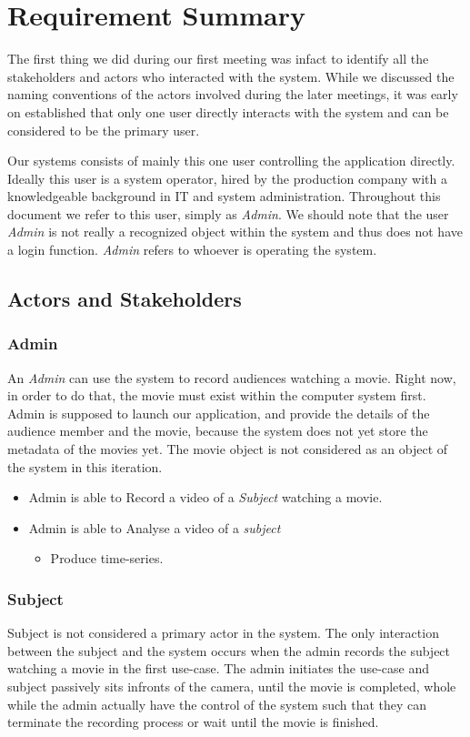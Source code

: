 \documentclass[12pt,a4paper,man]{report}
\begin{document}
\chapter{Requirement Summary}
\label{sec:orgbcf6d61}
The first thing we did during our first meeting was infact to identify all the stakeholders and actors who interacted with the system. While we discussed the naming conventions of the actors involved during the later meetings, it was early on established that only one user directly interacts with the system and can be considered to be the primary user.

Our systems consists of mainly this one user controlling the application directly. Ideally this user is a system operator, hired by the production company with a knowledgeable background in IT and system administration. Throughout this document we refer to this user, simply as \emph{Admin}. We should note that the user \emph{Admin} is not really a recognized object within the system and thus does not have a login function. \emph{Admin} refers to whoever is operating the system.

\section{Actors and Stakeholders}
\label{sec:org4428d88}
\subsection{Admin}
\label{sec:orgc68b94a}

An \emph{Admin} can use the system to record audiences watching a movie. Right now, in order to do that, the movie must exist within the computer system first. Admin is supposed to launch our application, and provide the details of the audience member and the movie, because the system does not yet store the metadata of the movies yet. The movie object is not considered as an object of the system in this iteration.

\begin{itemize}
\item Admin is able to Record a video of a \emph{Subject} watching a movie.
\item Admin is able to Analyse a video of a \emph{subject}
\begin{itemize}
\item Produce time-series.
\end{itemize}
\end{itemize}

\subsection{Subject}
\label{sec:org92e12ed}
Subject is not considered a primary actor in the system. The only interaction between the subject and the system occurs when the admin records the subject watching a movie in the first use-case. The admin initiates the use-case and subject passively sits infronts of the camera, until the movie is completed, whole while the admin actually have the control of the system such that they can terminate the recording process or wait until the movie is finished.
\end{document}
